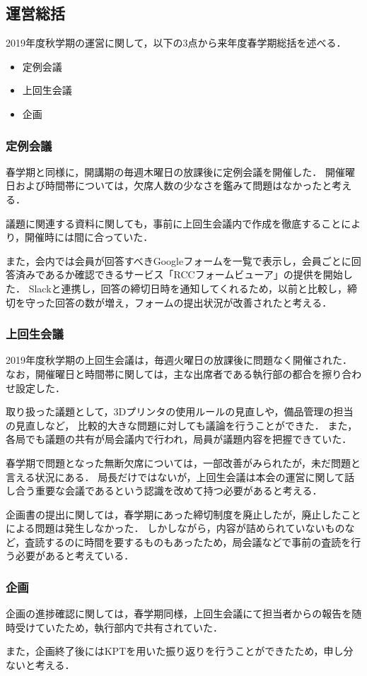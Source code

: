 \subsection*{運営総括}
2019年度秋学期の運営に関して，以下の3点から来年度春学期総括を述べる．
\begin{itemize}
    \item 定例会議
    \item 上回生会議
    \item 企画
\end{itemize}

\subsubsection*{定例会議}
春学期と同様に，開講期の毎週木曜日の放課後に定例会議を開催した．
開催曜日および時間帯については，欠席人数の少なさを鑑みて問題はなかったと考える．

議題に関連する資料に関しても，事前に上回生会議内で作成を徹底することにより，開催時には間に合っていた．

また，会内では会員が回答すべきGoogleフォームを一覧で表示し，会員ごとに回答済みであるか確認できるサービス「RCCフォームビューア」の提供を開始した．
Slackと連携し，回答の締切日時を通知してくれるため，以前と比較し，締切を守った回答の数が増え，フォームの提出状況が改善されたと考える．

\subsubsection*{上回生会議}
2019年度秋学期の上回生会議は，毎週火曜日の放課後に問題なく開催された．
なお，開催曜日と時間帯に関しては，主な出席者である執行部の都合を擦り合わせ設定した．

取り扱った議題として，3Dプリンタの使用ルールの見直しや，備品管理の担当の見直しなど，
比較的大きな問題に対しても議論を行うことができた．
また，各局でも議題の共有が局会議内で行われ，局員が議題内容を把握できていた．

春学期で問題となった無断欠席については，一部改善がみられたが，未だ問題と言える状況にある．
局長だけではないが，上回生会議は本会の運営に関して話し合う重要な会議であるという認識を改めて持つ必要があると考える．

企画書の提出に関しては，春学期にあった締切制度を廃止したが，廃止したことによる問題は発生しなかった．
しかしながら，内容が詰められていないものなど，査読するのに時間を要するものもあったため，局会議などで事前の査読を行う必要があると考えている．

\subsubsection*{企画}
企画の進捗確認に関しては，春学期同様，上回生会議にて担当者からの報告を随時受けていたため，執行部内で共有されていた．

また，企画終了後にはKPTを用いた振り返りを行うことができたため，申し分ないと考える．
